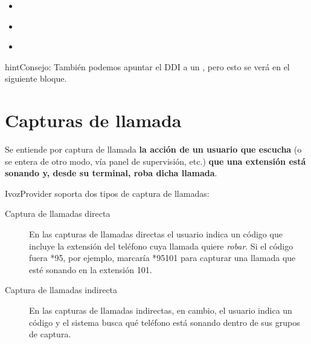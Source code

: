 \documentclass[letterpaper,10pt,spanish]{sphinxmanual}
\begin{document}
\noindent{}
\begin{itemize}
\item {} 
{\hyperref[pbx_features/ivrs:generic\string-ivrs]{}}

\end{itemize}

\noindent{}
\begin{itemize}
\item {} 
{\hyperref[pbx_features/ivrs:custom\string-ivrs]{}}

\end{itemize}

\noindent{}
\begin{itemize}
\item {} 
{\hyperref[pbx_features/conference_rooms:conference\string-rooms]{}}

\end{itemize}

\noindent{}

\begin{notice}{hint}{Consejo:}
También podemos apuntar el DDI a un {\hyperref[faxing/index:faxing\string-system]{}}, pero esto se verá en el siguiente bloque.
\end{notice}


\section{Capturas de llamada}
\label{pbx_features/call_captures:capture-groups}\label{pbx_features/call_captures::doc}\label{pbx_features/call_captures:capturas-de-llamada}
Se entiende por captura de llamada \textbf{la acción de un usuario que escucha} (o se entera de otro modo, vía panel de supervisión, etc.) \textbf{que una extensión está sonando y, desde su terminal, roba dicha llamada}.

IvozProvider soporta dos tipos de captura de llamadas:
\begin{description}
\item[{Captura de llamadas directa}] \leavevmode{}\label{pbx_features/call_captures:term-captura-de-llamadas-directa}
En las capturas de llamadas directas el usuario indica un código que incluye la extensión del teléfono cuya llamada quiere \emph{robar}. Si el código fuera *95, por ejemplo, marcaría *95101 para capturar una llamada que esté sonando en la extensión 101.

\item[{Captura de llamadas indirecta}] \leavevmode{}\label{pbx_features/call_captures:term-captura-de-llamadas-indirecta}
En las capturas de llamadas indirectas, en cambio, el usuario indica un código y el sistema busca qué teléfono está sonando dentro de sus grupos de captura.

\end{description}
\end{document}
